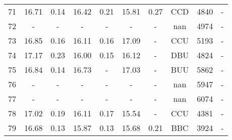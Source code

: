 \begin{longtable}{cccccccccc}
 71 & 16.71 & 0.14 & 16.42 & 0.21 & 15.81 & 0.27 & CCD & 4840 & -\\
 72 & - & - & - & - & - & - & nan & 4974 & -\\
 73 & 16.85 & 0.16 & 16.11 & 0.16 & 17.09 & - & CCU & 5193 & -\\
 74 & 17.17 & 0.23 & 16.00 & 0.15 & 16.12 & - & DBU & 4824 & -\\
 75 & 16.84 & 0.14 & 16.73 & - & 17.03 & - & BUU & 5862 & -\\
 76 & - & - & - & - & - & - & nan & 5947 & -\\
 77 & - & - & - & - & - & - & nan & 6074 & -\\
 78 & 17.02 & 0.19 & 16.11 & 0.17 & 15.54 & - & CCU & 4381 & -\\
 79 & 16.68 & 0.13 & 15.87 & 0.13 & 15.68 & 0.21 & BBC & 3924 & -\\
\end{longtable}